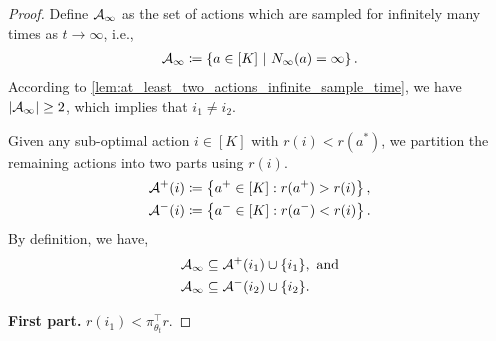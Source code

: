 \begin{proof}
Define ${\mathcal{A}}_\infty$ as the set of actions which are sampled for infinitely many times as $t \to \infty$, i.e.,
\begin{align}
\label{eq:expected_reward_range_proof_1}
    {\mathcal{A}}_\infty \coloneqq \left\{ a \in [K] \ | \ N_\infty(a) = \infty \right\}.
\end{align}
According to \cref{lem:at_least_two_actions_infinite_sample_time}, we have $| {\mathcal{A}}_\infty | \ge 2$, which implies that $i_1 \ne i_2$.

Given any sub-optimal action $i \in [K]$ with $r(i) < r(a^*)$, we partition the remaining actions into two parts using $r(i)$.
\begin{align}
\label{eq:expected_reward_range_proof_2a}
    {\mathcal{A}}^+(i) &\coloneqq \left\{ a^+ \in [K]: r(a^+) > r(i) \right\}, \\
\label{eq:expected_reward_range_proof_2b}
    {\mathcal{A}}^-(i) &\coloneqq \left\{ a^- \in [K]: r(a^-) < r(i) \right\}.
\end{align}
By definition, we have,
\begin{align}
\label{eq:expected_reward_range_proof_3a}
    &{\mathcal{A}}_\infty \subseteq {\mathcal{A}}^+(i_1) \cup \{ i_1 \}, \text{ and} \\
\label{eq:expected_reward_range_proof_3b}
    &{\mathcal{A}}_\infty \subseteq {\mathcal{A}}^-(i_2) \cup \{ i_2 \}.
\end{align}

\textbf{First part.} $r(i_1) < \pi_{\theta_t}^\top r$. 


\end{proof}

